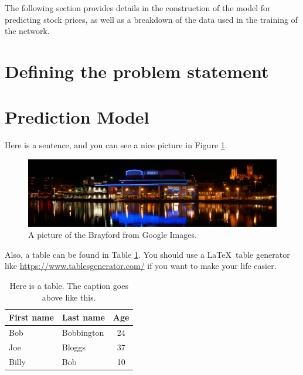 The following section provides details in the construction of the model for predicting stock prices, as well as a breakdown of the data used in the training of the network.

\section{Defining the problem statement}

\section{Prediction Model}

Here is a sentence, and you can see a nice picture in Figure \ref{fig:brayford}.

\begin{figure}[h]
    \centering
    \includegraphics[width=\textwidth]{figures/brayford.jpg}
    \caption{A picture of the Brayford from Google Images.}
    \label{fig:brayford}
\end{figure}

Also, a table can be found in Table \ref{tbl:example-table}. You should use a \LaTeX~table generator like \url{https://www.tablesgenerator.com/} if you want to make your life easier.

\begin{table}[h]
    \caption{Here is a table. The caption goes above like this.}
    \centering
    \begin{tabular}{l|l|c}
        First name & Last name & Age \\
        \hline\hline
        Bob & Bobbington & 24 \\
        Joe & Bloggs & 37 \\
        Billy & Bob & 10 \\

    \end{tabular}
    \label{tbl:example-table}
\end{table}